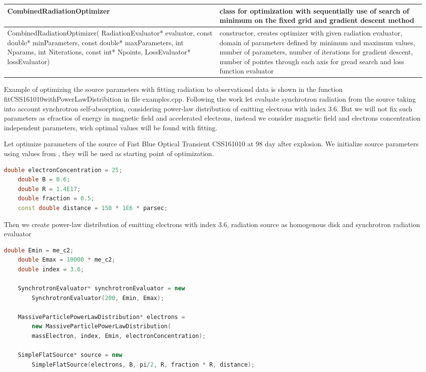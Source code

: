 \begin{small}
\begin{xtabular}{|p{0.41\textwidth}|p{0.59\textwidth}|}
		\hline
		\textbf{CombinedRadiationOptimizer} & class for optimization with sequentially use of search of minimum on the fixed grid and gradient descent method\\
		\hline
		CombinedRadiationOptimizer( RadiationEvaluator* evaluator, const double* minParameters, const double* maxParameters, int Nparams, int Niterations, const int* Npoints, LossEvaluator* lossEvaluator) & constructor, creates optimizer with given radiation evaluator, domain of parameters defined by minimum and maximum values, number of parameters, number of iterations for gradient descent, number of pointes through each axis for gread search and loss function evaluator\\
		\hline
	\end{xtabular}
\end{small}

Example of optimizing the source parameters with fitting radiation to observationsl data is shown in the function fitCSS161010withPowerLawDistribition in file examples.cpp. Following the work \cite{Coppejans2020} let evaluate synchrotron radiation from the source taking into account synchrotron self-absorption, considering power-law distribution of enitting electrons with index 3.6. But we will not fix such parameters as efractios of energy in magnetic field and accelerated electrons, instead we consider magnetic field and electrons concentration independent parameters, wich optimal values will be found with fitting.

Let optimize parameters of the source of Fast Blue Optical Transient CSS161010 at 98 day after explosion. We initialize source parameters using values from \cite{Coppejans2020}, they will be used as starting point of optimization.

\begin{lstlisting}[language=c++]
    double electronConcentration = 25;
    double B = 0.6;
    double R = 1.4E17;
    double fraction = 0.5;
    const double distance = 150 * 1E6 * parsec;
\end{lstlisting}

Then we create power-law distribution of emitting electrons with index 3.6, radiation source as homogenous disk and synchrotron radiation evaluator

\begin{lstlisting}[language=c++]
    double Emin = me_c2;
    double Emax = 10000 * me_c2;
    double index = 3.6;
	
    SynchrotronEvaluator* synchrotronEvaluator = new
        SynchrotronEvaluator(200, Emin, Emax);

    MassiveParticlePowerLawDistribution* electrons = 
        new MassiveParticlePowerLawDistribution(
        massElectron, index, Emin, electronConcentration);

    SimpleFlatSource* source = new
        SimpleFlatSource(electrons, B, pi/2, R, fraction * R, distance);
\end{lstlisting}

